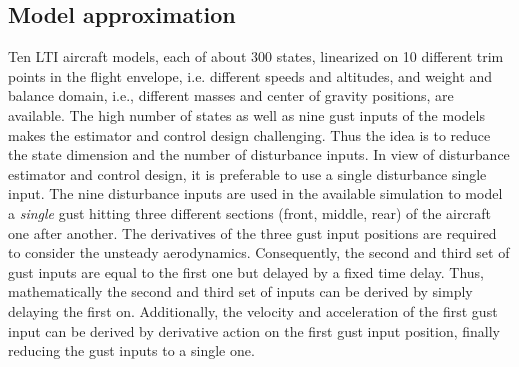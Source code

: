 \documentclass[graybox]{svmult}
\begin{document}
\subsection{Model approximation}\label{APPsubsec:model}
Ten LTI aircraft models, each of about 300 states, linearized on 10 different trim points in the flight envelope, i.e. different speeds and altitudes, and weight and balance domain, i.e., different masses and center of gravity positions, are available.
The high number of states as well as nine gust inputs of the models makes the 
estimator and control design challenging. Thus the idea is to reduce the state dimension and the number  of disturbance inputs. In view of disturbance estimator and control design, it is preferable to use a single disturbance single input.
The nine disturbance inputs are used in the available simulation to model a \textit{single} gust hitting  three different sections  (front, middle, rear) of the aircraft one after another. The derivatives of the three gust input positions are required to consider the unsteady aerodynamics. 
Consequently, the second and third set of gust inputs are equal to the first one but delayed by a fixed time delay. Thus, mathematically the second and third set of inputs can be derived by simply delaying the first on. Additionally, the velocity and acceleration of the first gust input can be derived by derivative action on the first gust input position, finally reducing the gust inputs to a single one.
\end{document}
